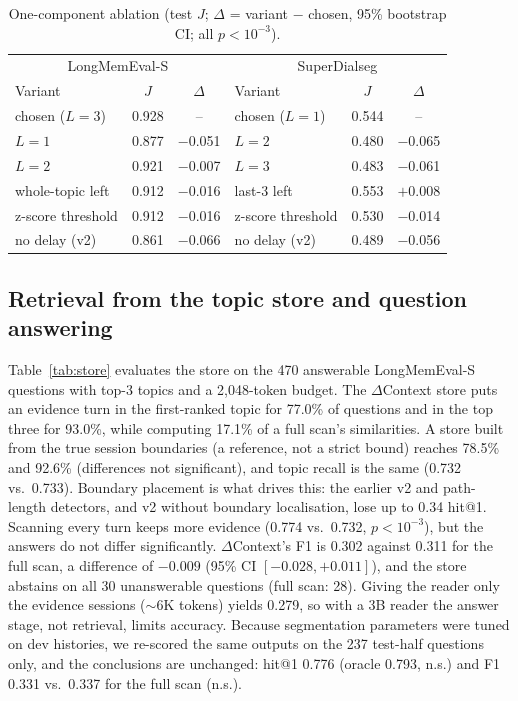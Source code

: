 \documentclass[journal]{IEEEtran}
\newcommand{\dc}{$\Delta$Context}
\begin{document}
\begin{table}[t]
\centering
\caption{One-component ablation (test $J$; $\Delta$ = variant $-$ chosen, 95\% bootstrap CI; all $p<10^{-3}$).}
\label{tab:abl}
\footnotesize
\setlength{\tabcolsep}{3pt}
\begin{tabular}{@{}lcc|lcc@{}}
\toprule
\multicolumn{3}{c|}{LongMemEval-S} & \multicolumn{3}{c}{SuperDialseg} \\
Variant & $J$ & $\Delta$ & Variant & $J$ & $\Delta$ \\
\midrule
chosen ($L{=}3$) & 0.928 & -- & chosen ($L{=}1$) & 0.544 & -- \\
$L=1$ & 0.877 & $-$0.051 & $L=2$ & 0.480 & $-$0.065 \\
$L=2$ & 0.921 & $-$0.007 & $L=3$ & 0.483 & $-$0.061 \\
whole-topic left & 0.912 & $-$0.016 & last-3 left & 0.553 & $+$0.008 \\
z-score threshold & 0.912 & $-$0.016 & z-score threshold & 0.530 & $-$0.014 \\
no delay (v2) & 0.861 & $-$0.066 & no delay (v2) & 0.489 & $-$0.056 \\
\bottomrule
\end{tabular}
\end{table}

\subsection{Retrieval from the topic store and question answering}
Table~\ref{tab:store} evaluates the store on the 470 answerable LongMemEval-S
questions with top-3 topics and a 2,048-token budget. The \dc{} store puts an
evidence turn in the first-ranked topic for 77.0\% of questions and in the top
three for 93.0\%, while computing 17.1\% of a full scan's similarities. A store
built from the true session boundaries (a reference, not a strict bound)
reaches 78.5\% and 92.6\% (differences not significant), and topic recall is
the same (0.732 vs.\ 0.733). Boundary placement is what drives this: the
earlier v2 and path-length detectors, and v2 without boundary localisation,
lose up to 0.34 hit@1. Scanning every turn keeps more evidence (0.774 vs.\
0.732, $p<10^{-3}$), but the answers do not differ significantly. \dc{}'s F1 is
0.302 against 0.311 for the full scan, a difference of $-0.009$ (95\% CI
$[-0.028,+0.011]$), and the store abstains on all 30 unanswerable questions
(full scan: 28). Giving the reader only the evidence sessions ($\sim$6K tokens)
yields 0.279, so with a 3B reader the answer stage, not retrieval, limits
accuracy. Because segmentation parameters were tuned on dev histories, we
re-scored the same outputs on the 237 test-half questions only, and the
conclusions are unchanged: hit@1 0.776 (oracle 0.793, n.s.) and F1 0.331 vs.\
0.337 for the full scan (n.s.).
\end{document}
